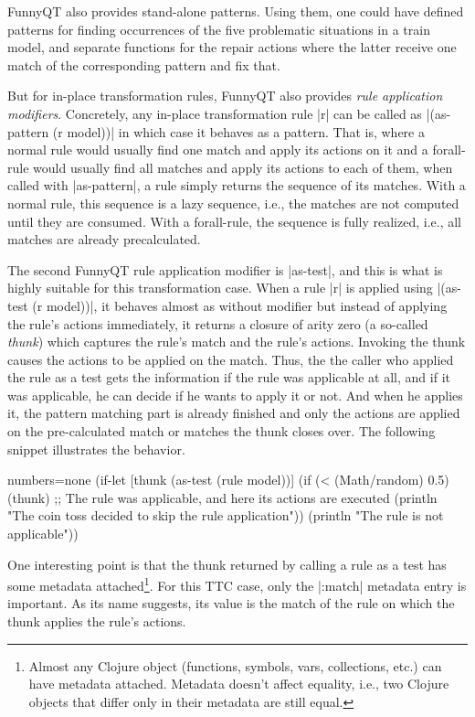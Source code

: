 \documentclass[submission]{eptcs}
\newcommand{\code}{\clojureinline}
\begin{document}
FunnyQT also provides stand-alone patterns.  Using them, one could have defined
patterns for finding occurrences of the five problematic situations in a train
model, and separate functions for the repair actions where the latter receive
one match of the corresponding pattern and fix that.

But for in-place transformation rules, FunnyQT also provides \emph{rule
  application modifiers}.  Concretely, any in-place transformation rule
\code|r| can be called as \code|(as-pattern (r model))| in which case it
behaves as a pattern.  That is, where a normal rule would usually find one
match and apply its actions on it and a forall-rule would usually find all
matches and apply its actions to each of them, when called with
\code|as-pattern|, a rule simply returns the sequence of its matches.  With a
normal rule, this sequence is a lazy sequence, i.e., the matches are not
computed until they are consumed.  With a forall-rule, the sequence is fully
realized, i.e., all matches are already precalculated.

The second FunnyQT rule application modifier is \code|as-test|, and this is
what is highly suitable for this transformation case.  When a rule \code|r| is
applied using \code|(as-test (r model))|, it behaves almost as without modifier
but instead of applying the rule's actions immediately, it returns a closure of
arity zero (a so-called \emph{thunk}) which captures the rule's match and the
rule's actions.  Invoking the thunk causes the actions to be applied on the
match.  Thus, the the caller who applied the rule as a test gets the
information if the rule was applicable at all, and if it was applicable, he can
decide if he wants to apply it or not.  And when he applies it, the pattern
matching part is already finished and only the actions are applied on the
pre-calculated match or matches the thunk closes over.  The following snippet
illustrates the behavior.

\begin{clojurecode*}{numbers=none}
(if-let [thunk (as-test (rule model))]
  (if (< (Math/random) 0.5)
    (thunk) ;; The rule was applicable, and here its actions are executed
    (println "The coin toss decided to skip the rule application"))
  (println "The rule is not applicable"))
\end{clojurecode*}

One interesting point is that the thunk returned by calling a rule as a test
has some metadata attached\footnote{Almost any Clojure object (functions,
  symbols, vars, collections, etc.) can have metadata attached.  Metadata
  doesn't affect equality, i.e., two Clojure objects that differ only in their
  metadata are still equal.}.  For this TTC case, only the \code|:match|
metadata entry is important.  As its name suggests, its value is the match of
the rule on which the thunk applies the rule's actions.
\end{document}
